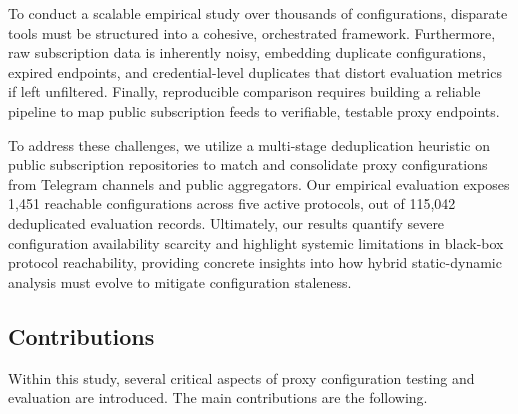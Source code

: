 \documentclass[10pt,conference]{IEEEtran}
\begin{document}
To conduct a scalable empirical study over thousands of configurations, disparate tools must be structured into a cohesive, orchestrated framework.
Furthermore, raw subscription data is inherently noisy, embedding duplicate configurations, expired endpoints, and credential-level duplicates that distort evaluation metrics if left unfiltered.
Finally, reproducible comparison requires building a reliable pipeline to map public subscription feeds to verifiable, testable proxy endpoints.

To address these challenges, we utilize a multi-stage deduplication heuristic on public subscription repositories to match and consolidate proxy configurations from Telegram channels and public aggregators.
Our empirical evaluation exposes 1,451 reachable configurations across five active protocols, out of 115,042 deduplicated evaluation records.
Ultimately, our results quantify severe configuration availability scarcity and highlight systemic limitations in black-box protocol reachability, providing concrete insights into how hybrid static-dynamic analysis must evolve to mitigate configuration staleness.

\subsection{Contributions}
Within this study, several critical aspects of proxy configuration testing and evaluation are introduced.
The main contributions are the following.
\end{document}
